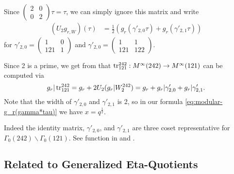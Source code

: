 \documentclass{article}
\begin{document}
Since $\left(\begin{smallmatrix}2&0\\0&2\end{smallmatrix}\right)\tau =
\tau$, we can simply ignore this matrix and write
\begin{align*}
  (U_2 g_{r, W})(\tau)
  &=
    \frac{1}{2}\left(g_r(\gamma'_{2,0}\tau) + g_r(\gamma'_{2,1}\tau)\right)
\end{align*}
for
$\gamma'_{2,0} =
\left(\begin{smallmatrix}1&0\\121&1\end{smallmatrix}\right)$ and
$\gamma'_{2,0} =
\left(\begin{smallmatrix}1&1\\121&122\end{smallmatrix}\right)$.

Since 2 is a prime, we get from
\cite{Kohnen:WeierstrassPointsAtInfinity:2004} that
$\operatorname{tr}_{121}^{242}: M^\infty(242) \to M^\infty(121)$ can be computed via
\begin{gather*}
  g_r|\operatorname{tr}_{121}^{242}
  = g_r + 2 U_2(g_r|W_2^{242})
  = g_r + g_r|\gamma'_{2,0} + g_r|\gamma'_{2,1}.
\end{gather*}
Note that the width of $\gamma'_{2,0}$ and $\gamma'_{2,1}$ is 2, so in
our formula \eqref{eq:modular-g_r(gamma*tau)} we have
$x=q^{\frac{1}{2}}$.

Indeed the identity matrix, $\gamma'_{2,0}$, and $\gamma'_{2,1}$ are
three coset representative for
$\Gamma_0(242) \backslash \Gamma_0(121)$.
%
See function  in
 and \cite[Lemma~2.44]{Radu:PhD:2010}.































\subsection{Related to Generalized Eta-Quotients}
\end{document}
